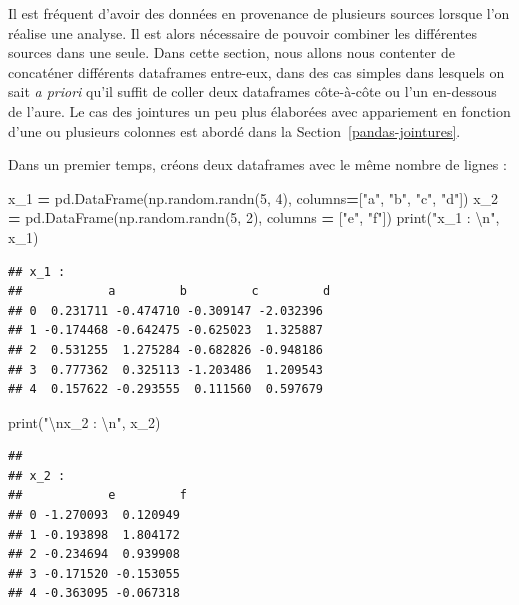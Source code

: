 \documentclass[
  12pt,
]{book}
\newenvironment{Shaded}{\begin{snugshade}}{\end{snugshade}}
\newcommand{\BuiltInTok}[1]{#1}
\newcommand{\CharTok}[1]{\textcolor[rgb]{0.31,0.60,0.02}{#1}}
\newcommand{\DecValTok}[1]{\textcolor[rgb]{0.00,0.00,0.81}{#1}}
\newcommand{\NormalTok}[1]{#1}
\newcommand{\OperatorTok}[1]{\textcolor[rgb]{0.81,0.36,0.00}{\textbf{#1}}}
\newcommand{\StringTok}[1]{\textcolor[rgb]{0.31,0.60,0.02}{#1}}
\numberwithin{equation}{section}
\numberwithin{countremarque}{section}
\begin{document}
Il est fréquent d'avoir des données en provenance de plusieurs sources lorsque l'on réalise une analyse. Il est alors nécessaire de pouvoir combiner les différentes sources dans une seule. Dans cette section, nous allons nous contenter de concaténer différents dataframes entre-eux, dans des cas simples dans lesquels on sait \emph{a priori} qu'il suffit de coller deux dataframes côte-à-côte ou l'un en-dessous de l'aure. Le cas des jointures un peu plus élaborées avec appariement en fonction d'une ou plusieurs colonnes est abordé dans la Section~\ref{pandas-jointures}.

Dans un premier temps, créons deux dataframes avec le même nombre de lignes :

\begin{Shaded}
\begin{Highlighting}[]
\NormalTok{x\_1 }\OperatorTok{=}\NormalTok{ pd.DataFrame(np.random.randn(}\DecValTok{5}\NormalTok{, }\DecValTok{4}\NormalTok{),}
\NormalTok{                   columns}\OperatorTok{=}\NormalTok{[}\StringTok{"a"}\NormalTok{, }\StringTok{"b"}\NormalTok{, }\StringTok{"c"}\NormalTok{, }\StringTok{"d"}\NormalTok{])}
\NormalTok{x\_2 }\OperatorTok{=}\NormalTok{ pd.DataFrame(np.random.randn(}\DecValTok{5}\NormalTok{, }\DecValTok{2}\NormalTok{),}
\NormalTok{                   columns }\OperatorTok{=}\NormalTok{ [}\StringTok{"e"}\NormalTok{, }\StringTok{"f"}\NormalTok{])}
\BuiltInTok{print}\NormalTok{(}\StringTok{"x\_1 : }\CharTok{\textbackslash{}n}\StringTok{"}\NormalTok{, x\_1)}
\end{Highlighting}
\end{Shaded}

\begin{lstlisting}
## x_1 : 
##            a         b         c         d
## 0  0.231711 -0.474710 -0.309147 -2.032396
## 1 -0.174468 -0.642475 -0.625023  1.325887
## 2  0.531255  1.275284 -0.682826 -0.948186
## 3  0.777362  0.325113 -1.203486  1.209543
## 4  0.157622 -0.293555  0.111560  0.597679
\end{lstlisting}

\begin{Shaded}
\begin{Highlighting}[]
\BuiltInTok{print}\NormalTok{(}\StringTok{"}\CharTok{\textbackslash{}n}\StringTok{x\_2 : }\CharTok{\textbackslash{}n}\StringTok{"}\NormalTok{, x\_2)}
\end{Highlighting}
\end{Shaded}

\begin{lstlisting}
## 
## x_2 : 
##            e         f
## 0 -1.270093  0.120949
## 1 -0.193898  1.804172
## 2 -0.234694  0.939908
## 3 -0.171520 -0.153055
## 4 -0.363095 -0.067318
\end{lstlisting}
\end{document}
